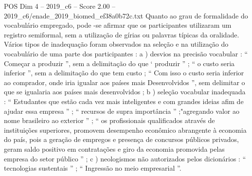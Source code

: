 \begin{textsample}{POS Dim 4 – 2019\_c6 – Score 2.00 – 2019\_c6/enade\_2019\_biomed\_ef38a0b72c.txt}
Quanto ao grau de formalidade do vocabulário empregado, pode -se afirmar que os participantes utilizaram um registro semiformal, sem a utilização de gírias ou palavras típicas da oralidade.
Vários tipos de inadequação foram observados na seleção e na utilização do vocabulário de uma parte dos participantes : a ) desvios na precisão vocabular : “ Começar a produzir ”, sem a delimitação do que ‘ produzir ” ; “ o custo seria inferior ”, sem a delimitação do que tem custo ; “ Com isso o custo seria inferior ao comprador, onde iria igualar aos países mais Desenvolvidos ”, sem delimitar o que se igualaria aos países mais desenvolvidos ; b ) seleção vocabular inadequada : “ Estudantes que estão cada vez mais inteligentes e com grandes ideias afim de ajudar essa empresa ” ; “ recursos de supra importância ” ;"agregando valor ao nome brasileiro ao exterior ” ; “ os profissionais qualificados através de instituições superiores, promovem desempenho econômico abrangente à economia do país, pois a geração de empregos e presença de concursos públicos privados, geram saldo positivo em contratações e giro da economia promovida pelas empresa do setor público ” ; c ) neologismos não autorizados pelos dicionários : “ tecnologias sustentais ” ; “ Ingressão no meio empresarial ”.

\end{textsample}
